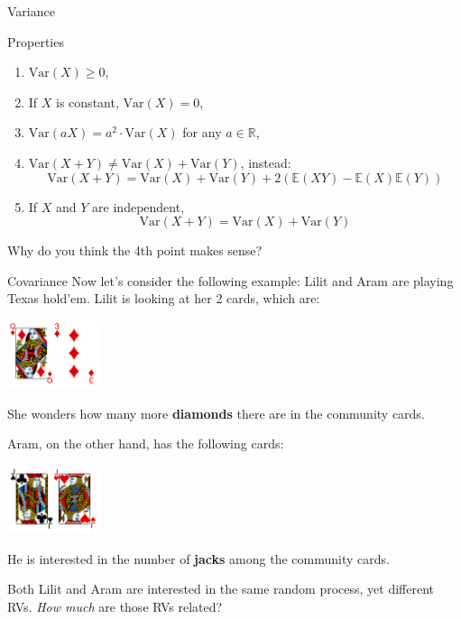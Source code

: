 \documentclass{beamer}
\newcommand{\R}{\mathbb{R}}
\newcommand{\E}{\mathbb{E}}
\newcommand{\Var}{\text{Var}}
\begin{document}
	
	\begin{frame}{Variance}
		\begin{block}{Properties}
			\begin{enumerate}[<+->]
				\item $\Var(X) \ge 0$,
				\item If $X$ is constant, $\Var(X)=0$,
				\item $\Var(aX) = a^2\cdot \Var(X)$ for any $a\in\R$,
				\item $\Var(X+Y) \ne \Var(X) + \Var(Y)$, instead:
				\[ \Var(X+Y) = \Var(X) + \Var(Y) + 2(\E(XY) - \E(X)\E(Y))\]
				\item If $X$ and $Y$ are independent,
				\[\Var(X + Y ) = \Var(X) + \Var(Y )\]
			\end{enumerate}
		\end{block}
\pause Why do you think the 4th point makes sense?		
	\end{frame}
	
	
	
	\begin{frame}{Covariance}
			Now let's consider the following example: \pause Lilit and Aram are playing Texas hold'em.	\pause Lilit is looking at her 2 cards, which are:
			\begin{center}
				
				\includegraphics[width=0.2\textwidth, height=\textheight, keepaspectratio]{lilit.png}
			\end{center}
			She wonders how many more \textbf{diamonds} there are in the community cards.\pause
			
			Aram, on the other hand, has the following cards:
			\begin{center}
				
				\includegraphics[width=0.2\textwidth, height=\textheight, keepaspectratio]{aram.png}
			\end{center}
			He is interested in the number of \textbf{jacks} among the community cards.\pause
			
			Both Lilit and Aram are interested in the same random process, yet different RVs. \textit{How much} are those RVs related?
	\end{frame}
\end{document}
